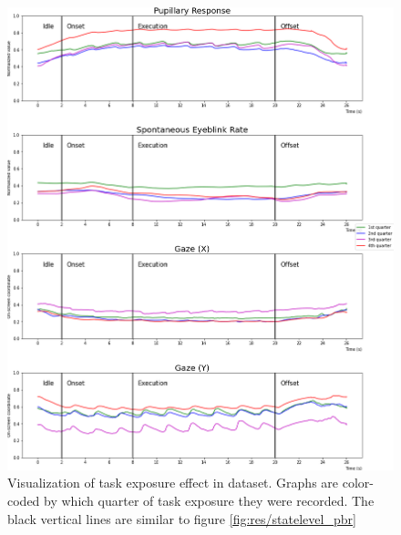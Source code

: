 \begin{figure}[h]
    \centering
    \includegraphics[width=\textwidth]{figures/impl_taskexposurevisualization.png}
    \caption{Visualization of task exposure effect in dataset. Graphs are color-coded by which quarter of task exposure they were recorded. The black vertical lines are similar to figure \ref{fig:res/statelevel_pbr}}
    \label{fig:res/taskexposure}
\end{figure}
\FloatBarrier